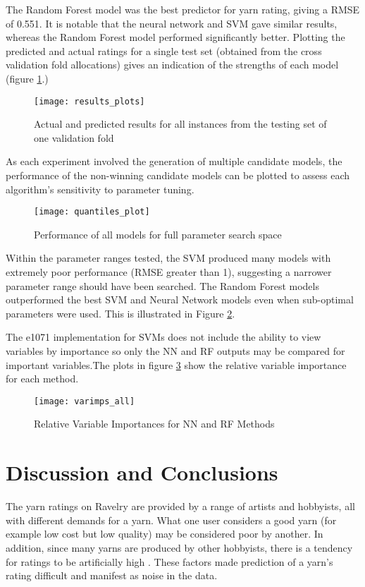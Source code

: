 \documentclass[journal]{IEEEtran}
\begin{document}
\vspace{5mm}


The Random Forest model was the best predictor for yarn rating, giving a RMSE of 0.551. It is notable that the neural network and SVM gave similar results, whereas the Random Forest model performed significantly better. Plotting the predicted and actual ratings for a single test set (obtained from the cross validation fold allocations) gives an indication of the strengths of each model (figure \ref{fig:RP}.)

\begin{figure}[h]
\caption{Actual and predicted results for all instances from the testing set of one validation fold}
\centering
\texttt{[image: results\_plots]}
\label{fig:RP}
\end{figure}

As each experiment involved the generation of multiple candidate models, the performance of the non-winning candidate models can be plotted to assess each algorithm’s sensitivity to parameter tuning.

\begin{figure}[h]
\caption{Performance of all models for full parameter search space}
\centering
\texttt{[image: quantiles\_plot]}
\label{fig:QP}
\end{figure}

Within the parameter ranges tested, the SVM produced many models with extremely poor performance (RMSE greater than 1), suggesting a narrower parameter range should have been searched.  The Random Forest models outperformed the best SVM and Neural Network models even when sub-optimal parameters were used. This is illustrated in Figure \ref{fig:QP}. 



The e1071 implementation for SVMs does not include the ability to view variables by importance so only the NN and RF outputs may be compared for important variables.The plots in figure \ref{fig:VAR} show the relative variable importance for each method.

\begin{figure}[h]
\caption{Relative Variable Importances for NN and RF Methods}
\centering
\texttt{[image: varimps\_all]}
\label{fig:VAR}
\end{figure}
\vspace{5mm}





\section{Discussion and Conclusions}
The yarn ratings on Ravelry are provided by a range of artists and hobbyists, all with different demands for a yarn. What one user considers a good yarn (for example low cost but low quality) may be considered poor by another. In addition, since many yarns are produced by other hobbyists, there is a tendency for ratings to be artificially high \cite{jforbes}. These factors made prediction of a yarn’s rating difficult and manifest as noise in the data.\\
\end{document}
